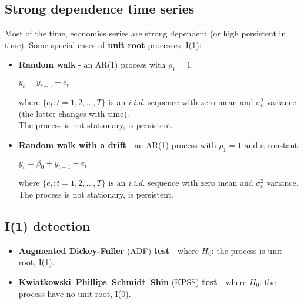 \documentclass[10pt, a4paper, landscape]{extarticle}
\begin{document}
\begin{multicols}{3}
\section*{Strong dependence time series}
	Most of the time, economics series are strong dependent (or high persistent in time). Some special cases of \textbf{unit root} processes, I(1):
	\begin{itemize}[leftmargin=*]
		\item \textbf{Random walk} - an AR(1) process with $\rho_1 = 1$.
		\begin{center}
			$y_t = y_{t-1} + e_t$
		\end{center}
		where $\lbrace e_t : t = 1, 2, ..., T \rbrace$ is an \textsl{i.i.d.} sequence with zero mean and $\sigma^2_e$ variance (the latter changes with time). \\
		The process is not stationary, is persistent.
		\item \textbf{Random walk with a \href{https://www.youtube.com/watch?v=pS5d77DQHOI}{drift}} - an AR(1) process with $\rho_1 = 1$ and a constant.
		\begin{center}
			$y_t = \beta_0 + y_{t-1} + e_t$
		\end{center}
		where $\lbrace e_t : t = 1, 2, ..., T \rbrace$ is an \textsl{i.i.d.} sequence with zero mean and $\sigma^2_e$ variance. \\
		The process is not stationary, is persistent.
	\end{itemize}
	\subsection*{I(1) detection}
		\begin{itemize}[leftmargin=*]
			\item \textbf{Augmented Dickey-Fuller} (ADF) \textbf{test} - where $H_0$: the process is unit root, I(1).
			\item \textbf{Kwiatkowski–Phillips–Schmidt–Shin} (KPSS) \textbf{test} - where $H_0$: the process have no unit root, I(0).
		\end{itemize}

\end{multicols}
\end{document}
